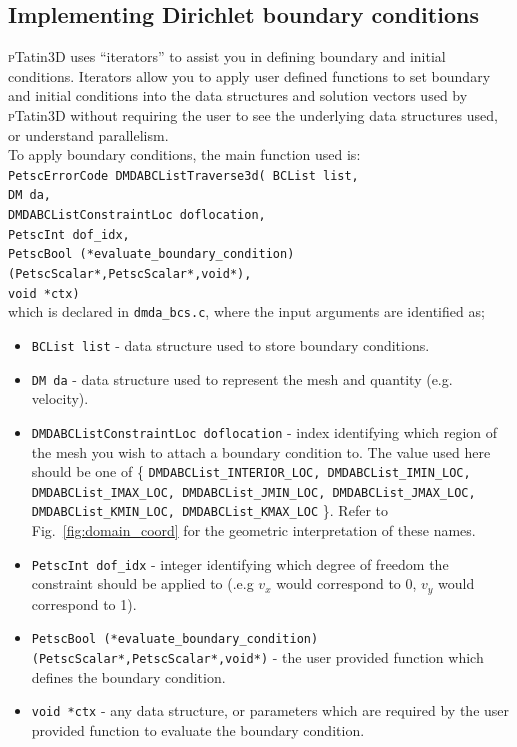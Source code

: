 \documentclass[paper=a4, fontsize=11pt,twoside]{scrartcl}
\newcommand{\ptat}{{{\textsc pTatin3D}}}
\newcommand{\shellcmd}[1]{\\\indent\indent\texttt{\hspace{5mm}\footnotesize #1}\\}
\newcommand{\unix}[1]{\texttt{\footnotesize #1}}
\begin{document}
{{\subsection{Implementing Dirichlet boundary conditions}
{\ptat} uses ``iterators'' to assist you in defining boundary and initial conditions. Iterators allow you to apply user defined functions to set boundary and initial conditions into the data structures and solution vectors used by {\ptat} without requiring the user to see the underlying data structures used, or understand parallelism.
\\[8pt]
To apply boundary conditions, the main function used is:
\shellcmd{PetscErrorCode DMDABCListTraverse3d( \newline
 BCList list, \\
  DM da, \\
  DMDABCListConstraintLoc doflocation, \\
  PetscInt dof\_idx, \\
  PetscBool (*evaluate\_boundary\_condition)(PetscScalar*,PetscScalar*,void*), \\
  void *ctx)} 
which is declared in \unix{dmda\_bcs.c}, where the input arguments are identified as;
\begin{itemize}
\item[] \unix{BCList list} - data structure used to store boundary conditions.
\item[] \unix{DM da} - data structure used to represent the mesh and quantity (e.g. velocity).
\item[] \unix{DMDABCListConstraintLoc doflocation} - index identifying which region of the mesh you wish to attach a boundary condition to. The value used here should be one of 
	\{ \unix{DMDABCList\_INTERIOR\_LOC, 
	DMDABCList\_IMIN\_LOC,
	DMDABCList\_IMAX\_LOC,
	DMDABCList\_JMIN\_LOC,
	DMDABCList\_JMAX\_LOC,
	DMDABCList\_KMIN\_LOC,
	DMDABCList\_KMAX\_LOC} \}.
Refer to Fig.~\ref{fig:domain_coord} for the geometric interpretation of these names.
\item[] \unix{PetscInt dof\_idx} - integer identifying which degree of freedom the constraint should be applied to (.e.g $v_x$ would correspond to 0, $v_y$ would correspond to 1).
\item[] \unix{PetscBool (*evaluate\_boundary\_condition)(PetscScalar*,PetscScalar*,void*)} - the user provided function which defines the boundary condition.
\item[] \unix{void *ctx} - any data structure, or parameters which are required by the user provided function to evaluate the boundary condition.
\end{itemize}

}}
\end{document}
